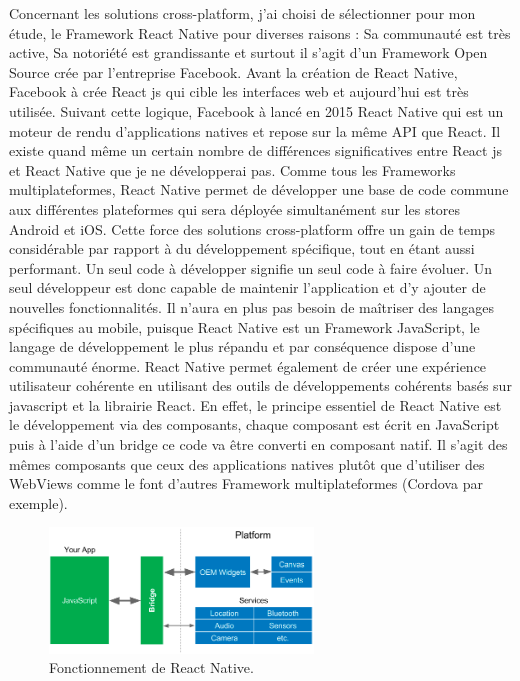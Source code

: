 Concernant les solutions cross-platform, j'ai choisi de sélectionner pour mon étude, le Framework React Native pour diverses raisons : Sa communauté est très active, Sa notoriété est grandissante et surtout il s'agit d'un Framework Open Source crée par l'entreprise Facebook. Avant la création de React Native, Facebook à crée React js qui cible les interfaces web et aujourd’hui est très utilisée. Suivant cette logique, Facebook à lancé en 2015 React Native qui est un moteur de rendu d’applications natives et repose sur la même API que React. Il existe quand même un certain nombre de différences significatives entre React js et React Native que je ne développerai pas.  Comme tous les Frameworks multiplateformes, React Native permet de développer une base de code commune aux différentes plateformes qui sera déployée simultanément sur les stores Android et iOS. Cette force des solutions cross-platform offre un gain de temps considérable par rapport à du développement spécifique, tout en étant aussi performant. Un seul code à développer signifie un seul code à faire évoluer. Un seul développeur est donc capable de maintenir l’application et d’y ajouter de nouvelles fonctionnalités. Il n’aura en plus pas besoin de maîtriser des langages spécifiques au mobile, puisque React Native est un Framework JavaScript, le langage de développement le plus répandu et par conséquence dispose d'une communauté énorme. React Native permet également de créer une expérience utilisateur cohérente en utilisant des outils de développements cohérents basés sur javascript et la librairie React. En effet, le principe essentiel de React Native est le développement via des composants, chaque composant est écrit en JavaScript puis à l’aide d’un bridge ce code va être converti en composant natif. Il s'agit des mêmes composants que ceux des applications natives plutôt que d’utiliser des WebViews comme le font d’autres Framework multiplateformes (Cordova par exemple).

\begin{figure}[htp]
  \centering
  \includegraphics[width=7cm]{images/reactnative}
  \caption{Fonctionnement de React Native.}
  \label{fig:fonctionnement-rn}
\end{figure}

